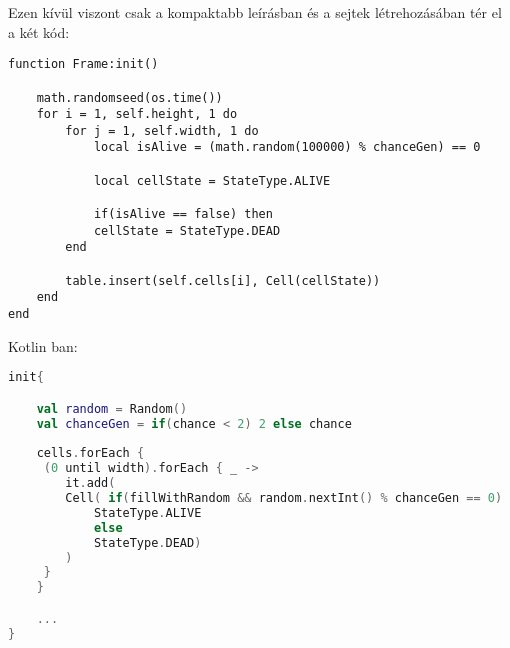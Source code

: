 Ezen kívül viszont csak a kompaktabb leírásban és a sejtek létrehozásában tér el a két kód:
\scriptsize
\begin{lstlisting}[style=Lua]
function Frame:init()

	math.randomseed(os.time())
	for i = 1, self.height, 1 do
		for j = 1, self.width, 1 do
			local isAlive = (math.random(100000) % chanceGen) == 0
	
			local cellState = StateType.ALIVE
			
			if(isAlive == false) then
			cellState = StateType.DEAD
		end
	
		table.insert(self.cells[i], Cell(cellState))
	end
end

\end{lstlisting}
\normalsize
\newpage
Kotlin ban:
\scriptsize
\begin{lstlisting}[language = Kotlin]
init{

	val random = Random()
	val chanceGen = if(chance < 2) 2 else chance
	
	cells.forEach {
	 (0 until width).forEach { _ ->
		it.add(
		Cell( if(fillWithRandom && random.nextInt() % chanceGen == 0) 
			StateType.ALIVE 
			else 
			StateType.DEAD)
		)
	 }
	}

	...
}
\end{lstlisting}
 
 
